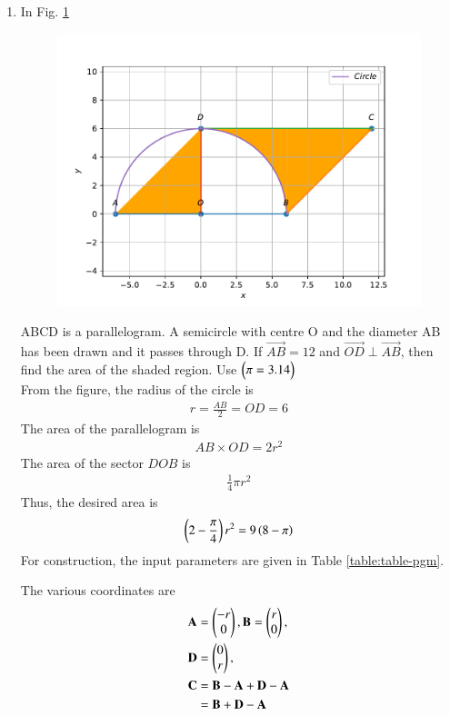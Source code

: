 \documentclass[journal,12pt,twocolumn]{IEEEtran}
\renewcommand\thesection{\arabic{section}}
\begin{document}
\begin{enumerate}[label=\thesection.\arabic*.,ref=\thesection.\theenumi]
    \item In Fig. 
	  \ref{fig:matrix-10-17.pdf}
  \begin{figure}
	  \centering 
	  \includegraphics[width=\columnwidth]{figs/matrix-10-17.pdf}
	  \caption{}
	  \label{fig:matrix-10-17.pdf}
	  \end{figure}
	    ABCD is a parallelogram. A semicircle with centre O and the diameter AB has been drawn and it passes through D. If $\Vec{AB} = 12$ and $\Vec{OD} \perp \Vec{AB}$, then find the area of the shaded region. Use $\begin{pmatrix}\pi = 3.14\end{pmatrix}$\\
	    \solution From the figure, the radius of the circle is  
	    \begin{align}
		    r = \frac{AB}{2} = OD = 6
	    \end{align}
	    The area of the parallelogram is 
	    \begin{align}
		    AB \times OD = 2r^2 
	    \end{align}
	    The area of the sector $DOB$ is 
	    \begin{align}
		    \frac{1}{4}\pi r^2 
	    \end{align}
	    Thus, the desired area is 
	    \begin{align}
		    \left(2 -  \frac{\pi}{4}\right) r^2 = 9\left(8 - \pi\right)
	    \end{align}
     For construction, the input parameters are given in Table 
\ref{table:table-pgm}.	
\begin{table}[ht!]
	
\caption{}
\label{table:table-pgm}	
\end{table}
The various coordinates are 
\begin{align}
	\mathbf{A} &= \begin{pmatrix}-r \\ 0\end{pmatrix},
	\mathbf{B} = \begin{pmatrix}r \\ 0\end{pmatrix},
	\\
	\mathbf{D} &= \begin{pmatrix}0 \\ r\end{pmatrix},
	\\
	\mathbf{C} &= \mathbf{B}-\mathbf{A} + \mathbf{D}-\mathbf{A}
	\\
	&= \mathbf{B}+ \mathbf{D}-\mathbf{A}
\end{align}


\end{enumerate}
\end{document}
